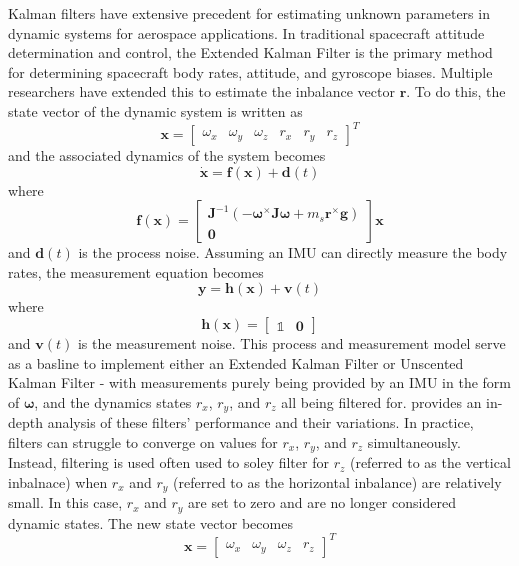 Kalman filters have extensive precedent for estimating unknown parameters in dynamic systems for aerospace applications. In traditional spacecraft attitude determination and control, the Extended Kalman Filter is the primary method for determining spacecraft body rates, attitude, and gyroscope biases.  Multiple researchers have extended this to estimate the inbalance vector $\bm{r}$. To do this, the state vector of the dynamic system is written as 
\begin{equation}
    \bm{x} = \begin{bmatrix} \omega_x & \omega_y & \omega_z & r_x & r_y & r_z \end{bmatrix}^T
\end{equation}
and the associated dynamics of the system becomes
\begin{equation}
    \dot{\bm{x}} = \bm{f}(\bm{x}) + \bm{d}(t)
\end{equation}
where 
\begin{equation}
    \bm{f}(\bm{x}) = \begin{bmatrix}
        \bm{J}^{-1}(-\bm{\omega}^\times \bm{J\omega} + m_s\bm{r}^{\times}\bm{g})
        \\
        \bm{0}
    \end{bmatrix}\bm{x}
\end{equation}
and $\bm{d}(t)$ is the process noise.  Assuming an IMU can directly measure the body rates, the measurement equation becomes
\begin{equation}
    \bm{y} = \bm{h}(\bm{x}) + \bm{v}(t)
\end{equation}
where
\begin{equation}
    \bm{h}(\bm{x})=
    \begin{bmatrix}
        \mathbb{1} & \bm{0}
    \end{bmatrix}
\end{equation}
and $\bm{v}(t)$ is the measurement noise. This process and measurement model serve as a basline to implement either an Extended Kalman Filter or Unscented Kalman Filter - with measurements purely being provided by an IMU in the form of $\bm{\omega}$, and the dynamics states $r_x$, $r_y$, and $r_z$ all being filtered for. \cite{silva_filtering_2018} provides an in-depth analysis of these filters' performance and their variations. In practice, filters can struggle to converge on values for $r_x$, $r_y$, and $r_z$ simultaneously. Instead, filtering is used often used to soley filter for $r_z$ (referred to as the vertical inbalnace) when $r_x$ and $r_y$ (referred to as the horizontal inbalance) are relatively small. In this case, $r_x$ and $r_y$ are set to zero and are no longer considered dynamic states. The new state vector becomes
\begin{equation}
    \bm{x} = \begin{bmatrix} \omega_x & \omega_y & \omega_z & r_z \end{bmatrix}^T
\end{equation}

